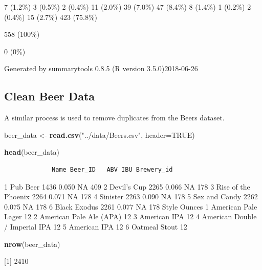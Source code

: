 \documentclass[]{article}
\newenvironment{Shaded}{\begin{snugshade}}{\end{snugshade}}
\newcommand{\KeywordTok}[1]{\textcolor[rgb]{0.13,0.29,0.53}{\textbf{#1}}}
\newcommand{\DataTypeTok}[1]{\textcolor[rgb]{0.13,0.29,0.53}{#1}}
\newcommand{\StringTok}[1]{\textcolor[rgb]{0.31,0.60,0.02}{#1}}
\newcommand{\OtherTok}[1]{\textcolor[rgb]{0.56,0.35,0.01}{#1}}
\newcommand{\NormalTok}[1]{#1}
\begin{document}
\begin{enumerate}
  7 (1.2\%) 3 (0.5\%) 2 (0.4\%) 11 (2.0\%) 39 (7.0\%) 47 (8.4\%) 8
  (1.4\%) 1 (0.2\%) 2 (0.4\%) 15 (2.7\%) 423 (75.8\%)

  558 (100\%)

  0 (0\%)

  Generated by summarytools 0.8.5 (R version 3.5.0)2018-06-26
\end{enumerate}

\subsection{Clean Beer Data}\label{clean-beer-data}

A similar process is used to remove duplicates from the Beers dataset.

\begin{Shaded}
\begin{Highlighting}[]
\NormalTok{beer_data <-}\StringTok{ }\KeywordTok{read.csv}\NormalTok{(}\StringTok{"../data/Beers.csv"}\NormalTok{, }\DataTypeTok{header=}\OtherTok{TRUE}\NormalTok{)}

\KeywordTok{head}\NormalTok{(beer_data)}
\end{Highlighting}
\end{Shaded}

\begin{verbatim}
             Name Beer_ID   ABV IBU Brewery_id
\end{verbatim}

1 Pub Beer 1436 0.050 NA 409 2 Devil's Cup 2265 0.066 NA 178 3 Rise of
the Phoenix 2264 0.071 NA 178 4 Sinister 2263 0.090 NA 178 5 Sex and
Candy 2262 0.075 NA 178 6 Black Exodus 2261 0.077 NA 178 Style Ounces 1
American Pale Lager 12 2 American Pale Ale (APA) 12 3 American IPA 12 4
American Double / Imperial IPA 12 5 American IPA 12 6 Oatmeal Stout 12

\begin{Shaded}
\begin{Highlighting}[]
\KeywordTok{nrow}\NormalTok{(beer_data)}
\end{Highlighting}
\end{Shaded}

{[}1{]} 2410
\end{document}
